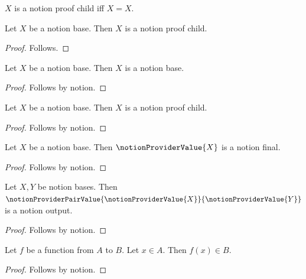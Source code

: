 


\begin{definition}\label{notion_proof_child}
    $X$ is a notion proof child iff $X=X$.
\end{definition}

\begin{classification}\label{notion_base_is_proof_child}
    Let $X$ be a notion base.
    Then $X$ is a notion proof child.
\end{classification}
\begin{proof}
    Follows.
\end{proof}

\begin{proposition}\label{notion_proof_direct}
    Let $X$ be a notion base.
    Then $X$ is a notion base.
\end{proposition}
\begin{proof}
    Follows by notion.
\end{proof}

\begin{proposition}\label{notion_proof_same_module_view}
    Let $X$ be a notion base.
    Then $X$ is a notion proof child.
\end{proposition}
\begin{proof}
    Follows by notion.
\end{proof}

\begin{proposition}\label{notion_proof_provider_chain}
    Let $X$ be a notion base.
    Then $\notionProviderValue{X}$ is a notion final.
\end{proposition}
\begin{proof}
    Follows by notion.
\end{proof}

\begin{proposition}\label{notion_proof_composite_provider}
    Let $X,Y$ be notion bases.
    Then $\notionProviderPairValue
        {\notionProviderValue{X}}
        {\notionProviderValue{Y}}$ is a notion output.
\end{proposition}
\begin{proof}
    Follows by notion.
\end{proof}

\begin{proposition}\label{notion_proof_endpoint}
    Let $f$ be a function from $A$ to $B$.
    Let $x\in A$.
    Then $f(x)\in B$.
\end{proposition}
\begin{proof}
    Follows by notion.
\end{proof}

